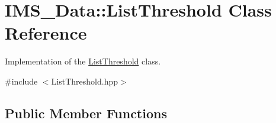 \hypertarget{classIMS__Data_1_1ListThreshold}{
\section{IMS\_\-Data::ListThreshold Class Reference}
\label{classIMS__Data_1_1ListThreshold}
}


Implementation of the \hyperlink{classIMS__Data_1_1ListThreshold}{ListThreshold} class.  




{\ttfamily \#include $<$ListThreshold.hpp$>$}

\subsection*{Public Member Functions}

